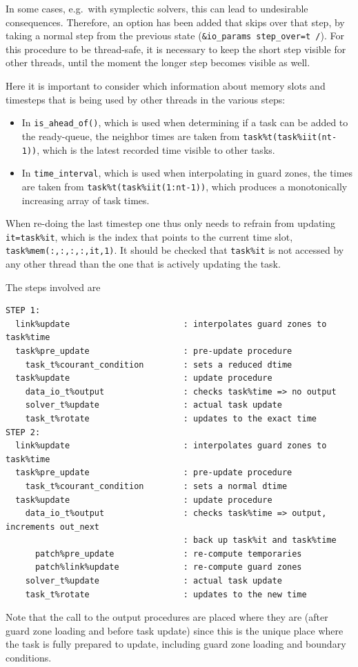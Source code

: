 \documentclass[paper=a4,fontsize=11pt]{scrartcl}
\numberwithin{equation}{section}		%
\numberwithin{figure}{section}			%
\numberwithin{table}{section}				%
\newcommand{\codecolor}{\color{Blue}}
\newcommand{\Code}[1]{{\codecolor\texttt{#1}}}
\def\isaheadof{\Code{is\_ahead\_of()}}
\begin{document}
In some cases, e.g.\ with symplectic solvers, this can lead to undesirable consequences.  Therefore, an option has been added that skips over that step, by taking a normal step from the previous state (\Code{\&io\_params step\_over=t /}).  For this procedure to be thread-safe, it is necessary to keep the short step visible for other threads, until the moment the longer step becomes visible as well.

Here it is important to consider which information about memory slots and timesteps that is being used by other threads in the various steps:
\begin{itemize}
    \item In \isaheadof, which is used when determining if a task can be added to the ready-queue, the neighbor times are taken from \Code{task\%t(task\%iit(nt-1))}, which is the latest recorded time visible to other tasks.
    \item In \Code{time\_interval}, which is used when interpolating in guard zones, the times are taken from \Code{task\%t(task\%iit(1:nt-1))}, which produces a monotonically increasing array of task times.
\end{itemize}
When re-doing the last timestep one thus only needs to refrain from updating \Code{it=task\%it}, which is the index that points to the current time slot, \Code{task\%mem(:,:,:,:,it,1)}. It should be checked that \Code{task\%it} is not accessed by any other thread than the one that is actively updating the task.

The steps involved are
{\codecolor\small\begin{verbatim}
STEP 1:
  link%update                       : interpolates guard zones to task%time
  task%pre_update                   : pre-update procedure
    task_t%courant_condition        : sets a reduced dtime
  task%update                       : update procedure
    data_io_t%output                : checks task%time => no output
    solver_t%update                 : actual task update
    task_t%rotate                   : updates to the exact time
STEP 2:
  link%update                       : interpolates guard zones to task%time
  task%pre_update                   : pre-update procedure
    task_t%courant_condition        : sets a normal dtime
  task%update                       : update procedure
    data_io_t%output                : checks task%time => output, increments out_next
                                    : back up task%it and task%time
      patch%pre_update              : re-compute temporaries
      patch%link%update             : re-compute guard zones
    solver_t%update                 : actual task update
    task_t%rotate                   : updates to the new time
\end{verbatim}}
Note that the call to the output procedures are placed where they are (after guard zone loading and before task update) since this is the unique place where the task is fully prepared to update, including guard zone loading and boundary conditions.
\end{document}
